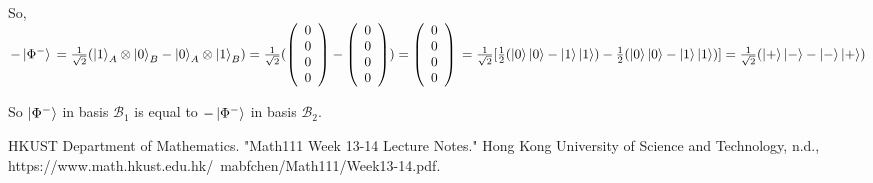 \documentclass{article}
\begin{document}
\begin{enumerate}
        So, $-\ket{\Phi^-}
        \\=\frac{1}{\sqrt{2}}(\ket{1}_A\otimes\ket{0}_B-\ket{0}_A\otimes\ket{1}_B)
        \\=\frac{1}{\sqrt{2}}(\left(\begin{array}{c}
            0\\0\\0\\0
        \end{array}\right)-\left(\begin{array}{c}
            0\\0\\0\\0
        \end{array}\right))
        \\=\left(\begin{array}{c}
            0\\0\\0\\0
        \end{array}\right)
        \\=\frac{1}{\sqrt{2}}[\frac{1}{2}(\ket{0}\ket{0}-\ket{1}\ket{1})-\frac{1}{2}(\ket{0}\ket{0}-\ket{1}\ket{1})]
        \\=\frac{1}{\sqrt{2}}(\ket{+}\ket{-}-\ket{-}\ket{+})
        $

        So $\ket{\Phi^-}$ in basis $\mathcal{B}_1$ is equal to $-\ket{\Phi^-}$ in basis $\mathcal{B}_2$.
        
\end{enumerate}
\begin{thebibliography}{99}
    HKUST Department of Mathematics.
    "Math111 Week 13-14 Lecture Notes."
    Hong Kong University of Science and Technology, n.d.,
    https://www.math.hkust.edu.hk/~mabfchen/Math111/Week13-14.pdf.
\end{thebibliography}
\end{document}
